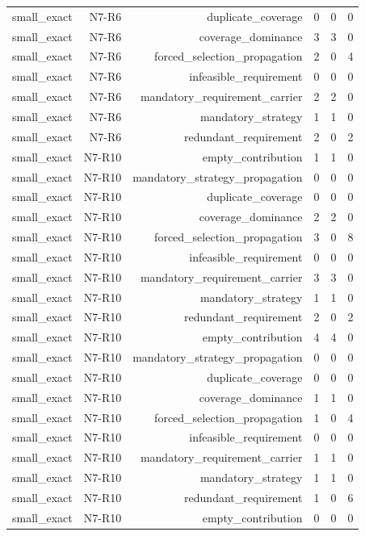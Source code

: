 {\begin{longtable}{lrrrrr}
small\_exact & N7-R6 & duplicate\_coverage & 0 & 0 & 0 \\
small\_exact & N7-R6 & coverage\_dominance & 3 & 3 & 0 \\
small\_exact & N7-R6 & forced\_selection\_propagation & 2 & 0 & 4 \\
small\_exact & N7-R6 & infeasible\_requirement & 0 & 0 & 0 \\
small\_exact & N7-R6 & mandatory\_requirement\_carrier & 2 & 2 & 0 \\
small\_exact & N7-R6 & mandatory\_strategy & 1 & 1 & 0 \\
small\_exact & N7-R6 & redundant\_requirement & 2 & 0 & 2 \\
small\_exact & N7-R10 & empty\_contribution & 1 & 1 & 0 \\
small\_exact & N7-R10 & mandatory\_strategy\_propagation & 0 & 0 & 0 \\
small\_exact & N7-R10 & duplicate\_coverage & 0 & 0 & 0 \\
small\_exact & N7-R10 & coverage\_dominance & 2 & 2 & 0 \\
small\_exact & N7-R10 & forced\_selection\_propagation & 3 & 0 & 8 \\
small\_exact & N7-R10 & infeasible\_requirement & 0 & 0 & 0 \\
small\_exact & N7-R10 & mandatory\_requirement\_carrier & 3 & 3 & 0 \\
small\_exact & N7-R10 & mandatory\_strategy & 1 & 1 & 0 \\
small\_exact & N7-R10 & redundant\_requirement & 2 & 0 & 2 \\
small\_exact & N7-R10 & empty\_contribution & 4 & 4 & 0 \\
small\_exact & N7-R10 & mandatory\_strategy\_propagation & 0 & 0 & 0 \\
small\_exact & N7-R10 & duplicate\_coverage & 0 & 0 & 0 \\
small\_exact & N7-R10 & coverage\_dominance & 1 & 1 & 0 \\
small\_exact & N7-R10 & forced\_selection\_propagation & 1 & 0 & 4 \\
small\_exact & N7-R10 & infeasible\_requirement & 0 & 0 & 0 \\
small\_exact & N7-R10 & mandatory\_requirement\_carrier & 1 & 1 & 0 \\
small\_exact & N7-R10 & mandatory\_strategy & 1 & 1 & 0 \\
small\_exact & N7-R10 & redundant\_requirement & 1 & 0 & 6 \\
small\_exact & N7-R10 & empty\_contribution & 0 & 0 & 0 \\

\end{longtable}}
